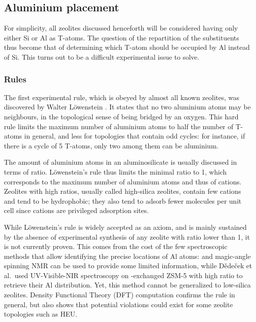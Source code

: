 \documentclass[main.tex]{subfiles}
\begin{document}
\subsection{Aluminium placement}

For simplicity, all zeolites discussed henceforth will be considered having only either Si or Al as T-atoms. The question of the repartition of the substituents thus become that of determining which T-atom should be occupied by Al instead of Si. This turns out to be a difficult experimental issue to solve.

\subsubsection{Rules}

The first experimental rule, which is obeyed by almost all known zeolites, was discovered by Walter L\"owenstein \cite{Loewenstein}. It states that no two aluminium atoms may be neighbours, in the topological sense of being bridged by an oxygen. This hard rule limits the maximum number of aluminium atoms to half the number of T-atoms in general, and less for topologies that contain odd cycles: for instance, if there is a cycle of 5 T-atoms, only two among them can be aluminium.

The amount of aluminium atoms in an aluminosilicate is usually discussed in terms of \SiAl ratio. L\"owenstein's rule thus limits the minimal \SiAl ratio to 1, which corresponds to the maximum number of aluminium atoms and thus of cations. Zeolites with high \SiAl ratios, usually called high-silica zeolites, contain few cations and tend to be hydrophobic; they also tend to adsorb fewer molecules per unit cell since cations are privileged adsorption sites.

While L\"owenstein's rule is widely accepted as an axiom, and is mainly sustained by the absence of experimental synthesis of any zeolite with \SiAl ratio lower than 1, it is not currently proven. This comes from the cost of the few spectroscopic methods that allow identifying the precise locations of Al atoms:  and  magic-angle spinning NMR can be used to provide some limited information\autocite{ZeolitesMagicAngle}, while D{\v{e}}de{\v{c}}ek et al.\,\cite{ZeolitesAlPairs,ZeolitesAlPairs2} used UV-Visible-NIR spectroscopy on -exchanged ZSM-5 with high \SiAl ratio to retrieve their Al distribution. Yet, this method cannot be generalized to low-silica zeolites. Density Functional Theory (DFT) computation confirms the rule in general, but also shows that potential violations could exist for some zeolite topologies such as HEU\autocite{HEUnonLowenstein}.
\end{document}
